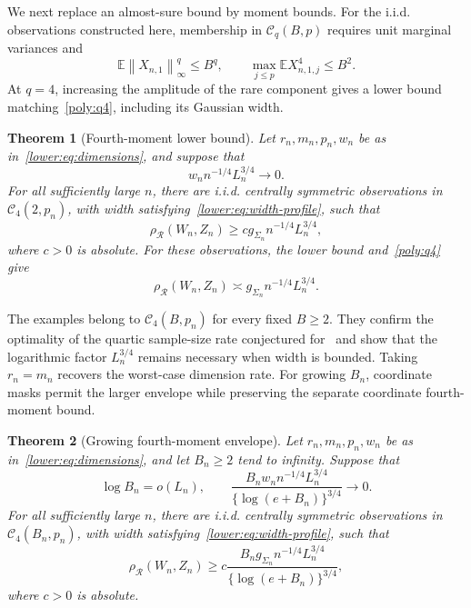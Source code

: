 \documentclass[11pt,letterpaper]{article}
\newenvironment{vSixBlock}{\color{magenta}}{}
\newtheorem{theorem}{Theorem}
\theoremstyle{remark}
\newcommand{\E}{\mathbb E}
\newcommand{\norm}[1]{\left\lVert#1\right\rVert}
\newcommand{\rh}{\rho_{\mathcal R}}
\begin{document}
\begin{vSixBlock}
We next replace an almost-sure bound by moment bounds. For the i.i.d.
observations constructed here, membership in \(\mathcal C_q(B,p)\)
requires unit marginal variances and
\[
 \E\norm{X_{n,1}}_\infty^q\le B^q,\qquad
 \max_{j\le p}\E X_{n,1,j}^4\le B^2.
\]
At \(q=4\), increasing the amplitude of the rare component gives
a lower bound matching~\eqref{poly:q4}, including its Gaussian width.

\begin{theorem}[Fourth-moment lower bound]\label{opt:q4-lower}
Let \(r_n,m_n,p_n,w_n\) be as in~\eqref{lower:eq:dimensions},
and suppose that
\[
 w_n n^{-1/4}L_n^{3/4}\longrightarrow0.
\]
For all sufficiently large \(n\), there are i.i.d. centrally
symmetric observations in \(\mathcal C_4(2,p_n)\), with width
satisfying~\eqref{lower:eq:width-profile}, such that
\begin{equation}
 \rh(W_n,Z_n)\ge c g_{\Sigma_n}n^{-1/4}L_n^{3/4},
 \label{opt:eq:q4-lower}
\end{equation}
where \(c>0\) is absolute. For these observations, the lower bound
and~\eqref{poly:q4} give
\begin{equation}
 \rh(W_n,Z_n)\asymp g_{\Sigma_n}n^{-1/4}L_n^{3/4}.
 \label{lower:q4-fixed}
\end{equation}
\end{theorem}

The examples belong to \(\mathcal C_4(B,p_n)\) for every fixed
\(B\ge2\). They confirm the optimality of the quartic sample-size
rate conjectured for~\cite[Theorem~2.5]{CCKK2022} and show that
the logarithmic factor \(L_n^{3/4}\) remains necessary when width
is bounded. Taking \(r_n=m_n\) recovers the worst-case dimension
rate. For growing \(B_n\), coordinate masks permit the larger
envelope while preserving the separate coordinate fourth-moment bound.

\begin{theorem}[Growing fourth-moment envelope]\label{opt:q4-growing}
Let \(r_n,m_n,p_n,w_n\) be as in~\eqref{lower:eq:dimensions},
and let \(B_n\ge2\) tend to infinity. Suppose that
\[
 \log B_n=o(L_n),\qquad
 \frac{B_n w_n n^{-1/4}L_n^{3/4}}
 {\{\log(e+B_n)\}^{3/4}}\longrightarrow0.
\]
For all sufficiently large \(n\), there are i.i.d. centrally
symmetric observations in \(\mathcal C_4(B_n,p_n)\), with width
satisfying~\eqref{lower:eq:width-profile}, such that
\begin{equation}
 \rh(W_n,Z_n)\ge
 c\frac{B_n g_{\Sigma_n}n^{-1/4}L_n^{3/4}}
 {\{\log(e+B_n)\}^{3/4}},
 \label{opt:eq:q4-growing}
\end{equation}
where \(c>0\) is absolute.
\end{theorem}


\end{vSixBlock}
\end{document}
